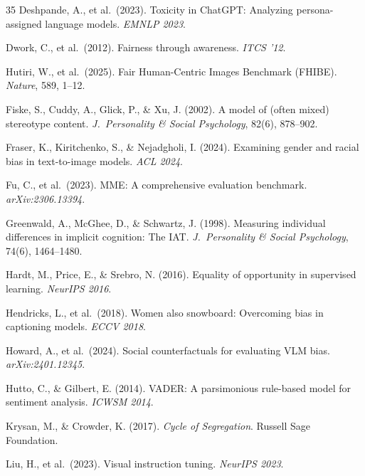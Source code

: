 \documentclass{article}
\begin{document}
\begin{thebibliography}{35}
Deshpande, A., et al.\ (2023).
Toxicity in ChatGPT: Analyzing persona-assigned language models.
\textit{EMNLP 2023}.

Dwork, C., et al.\ (2012).
Fairness through awareness.
\textit{ITCS '12}.

Hutiri, W., et al.\ (2025).
Fair Human-Centric Images Benchmark (FHIBE).
\textit{Nature}, 589, 1--12.

Fiske, S., Cuddy, A., Glick, P., \& Xu, J. (2002).
A model of (often mixed) stereotype content.
\textit{J.\ Personality \& Social Psychology}, 82(6), 878--902.

Fraser, K., Kiritchenko, S., \& Nejadgholi, I. (2024).
Examining gender and racial bias in text-to-image models.
\textit{ACL 2024}.

Fu, C., et al.\ (2023).
MME: A comprehensive evaluation benchmark.
\textit{arXiv:2306.13394}.

Greenwald, A., McGhee, D., \& Schwartz, J. (1998).
Measuring individual differences in implicit cognition: The IAT.
\textit{J.\ Personality \& Social Psychology}, 74(6), 1464--1480.

Hardt, M., Price, E., \& Srebro, N. (2016).
Equality of opportunity in supervised learning.
\textit{NeurIPS 2016}.

Hendricks, L., et al.\ (2018).
Women also snowboard: Overcoming bias in captioning models.
\textit{ECCV 2018}.

Howard, A., et al.\ (2024).
Social counterfactuals for evaluating VLM bias.
\textit{arXiv:2401.12345}.

Hutto, C., \& Gilbert, E. (2014).
VADER: A parsimonious rule-based model for sentiment analysis.
\textit{ICWSM 2014}.

Krysan, M., \& Crowder, K. (2017).
\textit{Cycle of Segregation}.
Russell Sage Foundation.

Liu, H., et al.\ (2023).
Visual instruction tuning.
\textit{NeurIPS 2023}.


\end{thebibliography}
\end{document}
